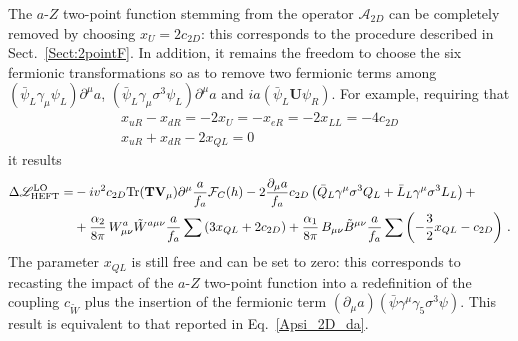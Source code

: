 \documentclass[11pt]{article}
\newcommand{\g}{\gamma}
\newcommand{\s}{\sigma}
\newcommand{\A}{\mathcal{A}}
\newcommand{\F}{\mathcal{F}}
\newcommand{\T}{\mathbf{T}}
\newcommand{\U}{\mathbf{U}}
\newcommand{\V}{\mathbf{V}}
\newcommand{\BBd}{B_{\mu\nu}}
\newcommand{\WWd}{W_{\mu\nu}}
\newcommand{\tr}{{\rm Tr}}
\newcommand{\de}{\partial}
\renewcommand{\[}{\begin{equation}}
\renewcommand{\]}{\end{equation}}
\newcommand{\LL}{\mathscr{L}}
\begin{document}
\begin{appendices}
The $a$-$Z$ two-point function stemming from the operator $\A_{2D}$ can be completely removed by choosing $x_U=2c_{2D}$: this corresponds to the procedure described in Sect.~\ref{Sect:2pointF}. In addition, it remains the freedom to choose the six fermionic transformations so as to remove two fermionic terms among $(\bar{\psi}_L \g_\mu\psi_L)\de^\mu a$, $(\bar{\psi}_L\g_\mu\s^3\psi_L)\de^\mu a$ and $i a(\bar{\psi}_L\U\psi_R)$. For example, requiring that
\begin{equation}
\begin{gathered}
x_{uR}-x_{dR} = -2x_U=- x_{eR} = -2x_{LL}=-4c_{2D}\\  
x_{uR}+x_{dR} - 2x_{QL} =0
\end{gathered} 
\end{equation} 
it results 
\begin{equation}
\begin{split}
 \Delta\LL_{\text{HEFT}}^\text{LO} = &
 -iv^2c_{2D}\tr(\T\V_\mu)\de^\mu\frac{a}{f_a}\F_C(h)
-2\frac{\de_\mu a}{f_a} c_{2D}\left(
\bar{Q}_{L}\g^\mu\s^3Q_{L}  +\bar{L}_{L}\g^\mu\s^3 L_{L}\right)+\\
 &+\dfrac{\alpha_2}{8\pi}\,\WWd^a\tilde{W}^{a\mu\nu}\frac{a}{f_a}\sum\left(3x_{QL}+2c_{2D}\right)+\dfrac{\alpha_1}{8\pi}\,\BBd\tilde{B}^{\mu\nu}\frac{a}{f_a}\sum\left(-\frac{3}{2}x_{QL} -c_{2D} \right)\,.
\end{split}
\end{equation}
The parameter $x_{QL}$ is still free and can be set to zero: this corresponds to recasting the impact of the $a$-$Z$ two-point function into a redefinition of the coupling $c_{\tilde W}$ plus the insertion of the fermionic term $(\de_\mu a)(\bar{\psi}\g^\mu\g_5\s^3\psi)$. This result is equivalent to that reported in Eq.~\eqref{Apsi_2D_da}.



\end{appendices}
\end{document}
